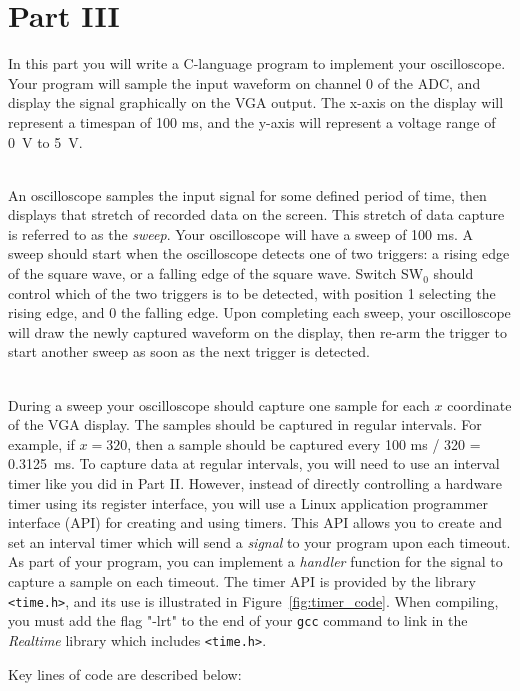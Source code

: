 \documentclass[epsfig,10pt,fullpage]{article}
\begin{document}
\noindent
\section*{Part III}

In this part you will write a C-language program to implement your oscilloscope.
Your program will sample the input waveform on channel 0 of the ADC, 
and display the signal graphically on the VGA output. The x-axis on the display will represent 
a timespan of 100 ms, and the y-axis will represent a voltage range of 0~V to 5~V. 

~\\
\noindent
An oscilloscope samples the input signal for some defined period of time, then displays that
stretch of recorded data on the screen. This stretch of data capture is referred to as the
{\it sweep}. Your oscilloscope will have a sweep of 100 ms. A sweep should start when
the oscilloscope detects one of two triggers: a rising edge of the square wave, or a falling edge 
of the square wave. Switch SW$_0$ should control which of the two triggers is to be detected, 
with position 1 selecting the rising edge, and 0 the falling edge. Upon completing each sweep, 
your oscilloscope will draw the newly captured waveform on the display, then re-arm the trigger
to start another sweep as soon as the next trigger is detected.

~\\
\noindent
During a sweep your oscilloscope should capture one sample for each $x$ coordinate of the 
VGA display. The samples should be captured in regular intervals. For example, if
$x=320$, then a sample should be captured every 100 ms / 320 = 0.3125~ms. To capture data 
at regular intervals, you will need to use an interval timer like you did in Part II. However,
instead of directly controlling a hardware timer using its register interface, you will use 
a Linux application programmer interface (API) for creating and using timers. This API allows 
you to create and set an interval timer which will send a {\it signal} to your program upon 
each timeout. As part of your program, you can implement a {\it handler} function for the signal to 
capture a sample on each timeout. The timer API is provided by the library \texttt{<time.h>}, 
and its use is illustrated in Figure~\ref{fig:timer_code}. When compiling, you must add the 
flag "-lrt" to the end of your \texttt{gcc} command to link in the \textit{Realtime} library 
which includes \texttt{<time.h>}. 

\newpage
Key lines of code are described below:
\end{document}
